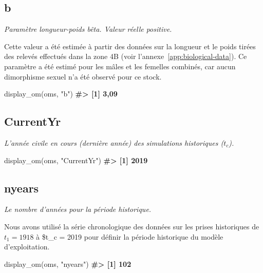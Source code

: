 \documentclass[french,11pt]{book}
\newenvironment{Shaded}{\begin{snugshade}}{\end{snugshade}}
\newcommand{\CommentTok}[1]{\textcolor[rgb]{0.56,0.35,0.01}{\textbf{#1}}}
\newcommand{\FunctionTok}[1]{\textcolor[rgb]{0.00,0.00,0.00}{#1}}
\newcommand{\NormalTok}[1]{#1}
\newcommand{\StringTok}[1]{\textcolor[rgb]{0.31,0.60,0.02}{#1}}
\begin{document}
\subsection{b}
\label{app:desc-stock-b-yelloweye}

\emph{Paramètre longueur-poids bêta. Valeur réelle positive.}

Cette valeur a été estimée à partir des données sur la longueur et le poids tirées des relevés effectués dans la zone 4B (voir l'annexe~\ref{app:biological-data}). Ce paramètre a été estimé pour les mâles et les femelles combinés, car aucun dimorphisme sexuel n'a été observé pour ce stock.
\begin{Shaded}
\begin{Highlighting}[]
\FunctionTok{display\_om}\NormalTok{(oms, }\StringTok{"b"}\NormalTok{)}
\CommentTok{\#\textgreater{} [1] 3,09}
\end{Highlighting}
\end{Shaded}
\label{app:desc-fleet-yelloweye}

\subsection{CurrentYr}
\label{app:desc-fleet-currentyr-yelloweye}

\emph{L'année civile en cours (dernière année) des simulations historiques (\(t_c\)).}
\begin{Shaded}
\begin{Highlighting}[]
\FunctionTok{display\_om}\NormalTok{(oms, }\StringTok{"CurrentYr"}\NormalTok{)}
\CommentTok{\#\textgreater{} [1] 2019}
\end{Highlighting}
\end{Shaded}
\subsection{nyears}
\label{app:desc-fleet-nyears-yelloweye}

\emph{Le nombre d'années pour la période historique.}

Nous avons utilisé la série chronologique des données sur les prises historiques de \(t_1 = 1918\) à \$t\_c = 2019 pour définir la période historique du modèle d'exploitation.
\begin{Shaded}
\begin{Highlighting}[]
\FunctionTok{display\_om}\NormalTok{(oms, }\StringTok{"nyears"}\NormalTok{)}
\CommentTok{\#\textgreater{} [1] 102}
\end{Highlighting}
\end{Shaded}
\end{document}
